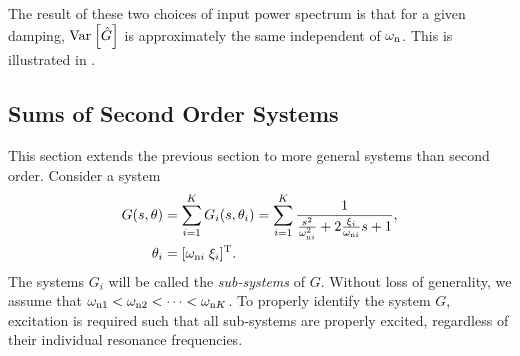 

The result of these two choices of input power spectrum is that for a given damping, $\var{\hat{G}}$ is approximately the same independent of $\wn$. 
This is illustrated in .

\subsection{Sums of Second Order Systems}
This section extends the previous section to more general systems than second order.
Consider a system
\begin{align}
G(s,\theta) &= \sum_{i=1}^{K} G_i(s,\theta_i)
             =\sum_{i=1}^{K}  \frac{1}
                                   {   \frac{s^2}{\wn[i]^2}
                                    + 2\frac{\damping[i]}{\wn[i]}s
                                    + 1},\\
\theta_i&=[\wn[i]\;\damping[i]]^{\T}.
\label{eq:excitation:sumSys}
\end{align}
The systems  $G_i$ will be called the \emph{sub-systems} of $G$. 
Without loss of generality, we assume that $\wn[1] < \wn[2] < \cdots < \wn[K]$. 
To properly identify the system $G$, excitation is required such that all sub-systems are properly excited, regardless of their individual resonance frequencies.

